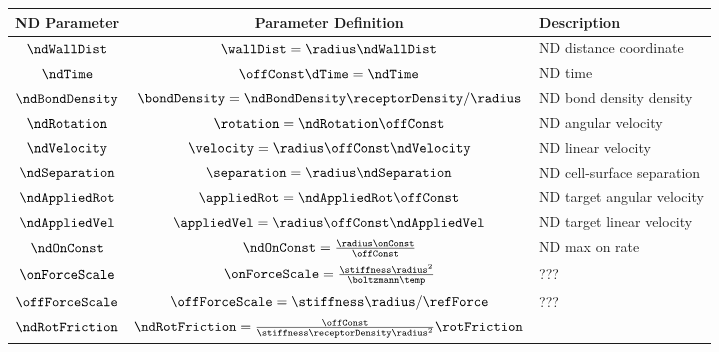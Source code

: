 \begin{table}
  \renewcommand{\arraystretch}{1.5}
  \centering
  \begin{tabular}{ccl}
    \toprule
    ND Parameter & Parameter Definition & Description \\
    \midrule
    $\ndWallDist$ & $\wallDist = \radius\ndWallDist$ & ND distance
                                                       coordinate \\
    $\ndTime$ & $\offConst \dTime = \ndTime$ & ND time \\ 
    $\ndBondDensity$ & $\bondDensity = \ndBondDensity
                       \receptorDensity/\radius$ & ND bond density
                                                   density \\
    $\ndRotation$ & $\rotation = \ndRotation \offConst$ & ND angular
                                                          velocity \\
    $\ndVelocity$ & $\velocity = \radius \offConst \ndVelocity$ & ND
                                                                  linear
                                                                  velocity
    \\ 
    $\ndSeparation$ & $\separation = \radius \ndSeparation$ & ND
                                                              cell-surface
                                                              separation
    \\ 
    $\ndAppliedRot$ & $\appliedRot = \ndAppliedRot \offConst$ & ND
                                                                target
                                                                angular
                                                                velocity \\
    $\ndAppliedVel$ & $\appliedVel = \radius \offConst \ndAppliedVel$
                                        & ND target linear velocity \\ 
    $\ndOnConst$ & $\ndOnConst = \frac{\radius \onConst}{\offConst}$
                                        & ND max on rate \\
    $\onForceScale$ & $\onForceScale = \frac{\stiffness
                      \radius^2}{\boltzmann \temp}$ & ??? \\
    $\offForceScale$ & $\offForceScale = \stiffness \radius/\refForce$
                                        & ??? \\
    $\ndRotFriction$ & $\ndRotFriction = \frac{\offConst}{\stiffness
                       \receptorDensity \radius^2} \rotFriction$ &

\end{tabular}
\end{table}
